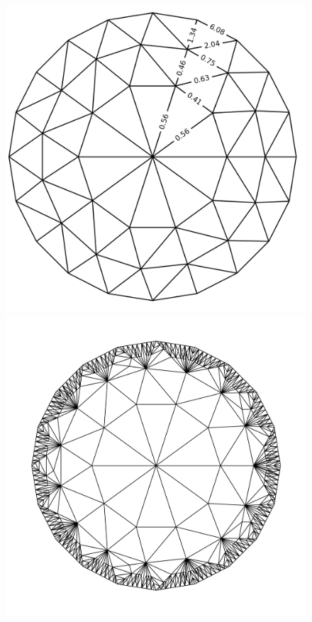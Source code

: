     \begin{figure}
        \centering
        \includegraphics[width=0.9\columnwidth]{../images/hyperbolic_disc_before_refinement_some_labels.png}
        \label{fig:hyper_before}
        \includegraphics[width=1.0\columnwidth]{../images/hyperbolic_disc_after_refinement.png}

\end{figure}
